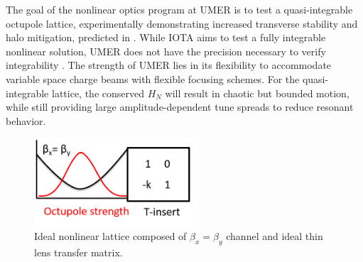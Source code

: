 The goal of the nonlinear optics program at UMER is to test a quasi-integrable octupole lattice, experimentally demonstrating increased transverse stability and halo mitigation, predicted in \cite{Webb}. While IOTA aims to test a fully integrable nonlinear solution, UMER does not have the precision necessary to verify integrability \cite{ipac12}. The strength of UMER lies in its flexibility to accommodate variable space charge beams with flexible focusing schemes. For the quasi-integrable lattice, the conserved $H_N$ will result in chaotic but bounded motion, while still providing large amplitude-dependent tune spreads to reduce resonant behavior.


\begin{figure}[!htb]
   \centering
   \includegraphics*[width=174pt]{1.figures/toy_model}
   \caption{Ideal nonlinear lattice composed of $\beta_x = \beta_y$ channel and ideal thin lens transfer matrix.}
   \label{iota}
\end{figure}
 

